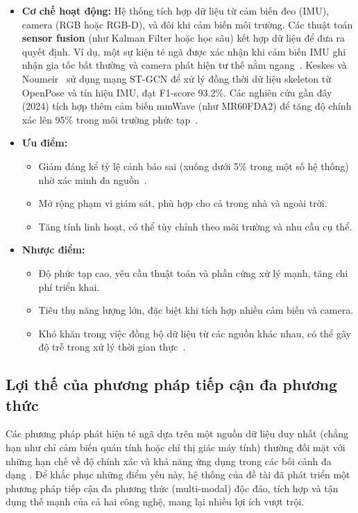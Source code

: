 \begin{itemize}
    \item \textbf{Cơ chế hoạt động:} Hệ thống tích hợp dữ liệu từ cảm biến đeo (IMU), camera (RGB hoặc RGB-D), và đôi khi cảm biến môi trường. Các thuật toán \textbf{sensor fusion} (như Kalman Filter hoặc học sâu) kết hợp dữ liệu để đưa ra quyết định. Ví dụ, một sự kiện té ngã được xác nhận khi cảm biến IMU ghi nhận gia tốc bất thường và camera phát hiện tư thế nằm ngang~\cite{rougier2011}. Keskes và Noumeir~\cite{keskes2021} sử dụng mạng ST-GCN để xử lý đồng thời dữ liệu skeleton từ OpenPose và tín hiệu IMU, đạt F1-score 93.2\%. Các nghiên cứu gần đây (2024) tích hợp thêm cảm biến mmWave (như MR60FDA2) để tăng độ chính xác lên 95\% trong môi trường phức tạp~\cite{mmwave2025}.
    \item \textbf{Ưu điểm:} 
    \begin{itemize}
        \item Giảm đáng kể tỷ lệ cảnh báo sai (xuống dưới 5\% trong một số hệ thống) nhờ xác minh đa nguồn~\cite{multimodal2024}.
        \item Mở rộng phạm vi giám sát, phù hợp cho cả trong nhà và ngoài trời.
        \item Tăng tính linh hoạt, có thể tùy chỉnh theo môi trường và nhu cầu cụ thể.
    \end{itemize}
    \item \textbf{Nhược điểm:}
    \begin{itemize}
        \item Độ phức tạp cao, yêu cầu thuật toán và phần cứng xử lý mạnh, tăng chi phí triển khai.
        \item Tiêu thụ năng lượng lớn, đặc biệt khi tích hợp nhiều cảm biến và camera.
        \item Khó khăn trong việc đồng bộ dữ liệu từ các nguồn khác nhau, có thể gây độ trễ trong xử lý thời gian thực~\cite{liu2018}.
    \end{itemize}
\end{itemize}

\subsection{Lợi thế của phương pháp tiếp cận đa phương thức}
Các phương pháp phát hiện té ngã dựa trên một nguồn dữ liệu duy nhất (chẳng hạn như chỉ cảm biến quán tính hoặc chỉ thị giác máy tính) thường đối mặt với những hạn chế về độ chính xác và khả năng ứng dụng trong các bối cảnh đa dạng \cite{researchgate_hybrid}. Để khắc phục những điểm yếu này, hệ thống của đề tài đã phát triển một phương pháp tiếp cận đa phương thức (multi-modal) độc đáo, tích hợp và tận dụng thế mạnh của cả hai công nghệ, mang lại nhiều lợi ích vượt trội.


